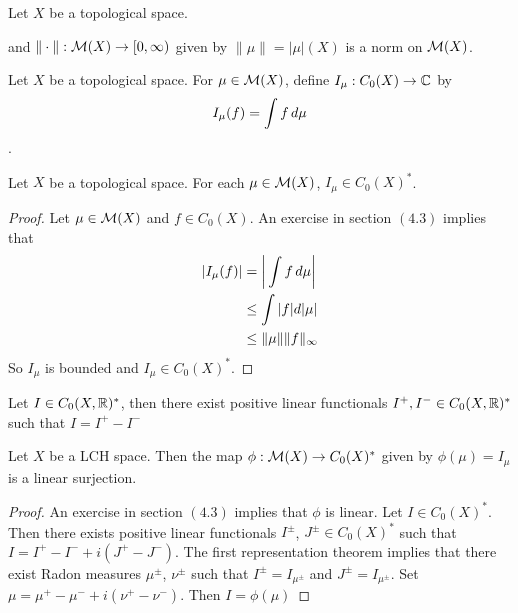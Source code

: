 \documentclass{book}
\begin{document}
	\begin{ex}
		Let $X$ be a topological space.
		
		and $\|\cdot\|: \mathcal{M}(X) \rightarrow [0,\infty)$ given by $\| \mu \| = |\mu|(X)$ is a norm on $\mathcal{M}(X)$. 
	\end{ex}		
	
	\begin{defn} \ld{00000} 
		Let $X$ be a topological space. For $\mu \in \mathcal{M}(X)$, define $I_{\mu} :C_0(X) \rightarrow \mathbb{C}$ by $$I_{\mu} (f) = \int f \, d \mu$$.
	\end{defn}
	
	\begin{ex}  
		Let $X$ be a topological space. For each $\mu \in \mathcal{M}(X)$, $I_\mu \in C_0(X)^*$.
	\end{ex}
	
	\begin{proof}
		Let $\mu \in \mathcal{M}(X)$ and $f \in C_0(X)$. An exercise in section $(4.3)$ implies that 
		\begin{align*}
			|I_{\mu}(f)| 
			&= \bigg| \int f \, d \mu \bigg| \\
			& \leq \int |f| d |\mu| \\
			& \leq \| \mu \| \|f\|_{\infty}
		\end{align*}
		So $I_{\mu}$ is bounded and $I_{\mu} \in C_0(X)^*$.
	\end{proof}
	
	\begin{thm}
		Let $I \in C_0(X, \mathbb{R})^*$, then there exist positive linear functionals $I^+, I^- \in C_0(X, \mathbb{R})^*$ such that $I = I^+ - I^-$
	\end{thm}
	
	\begin{ex}  
		Let $X$ be a LCH space. Then the map $ \phi: \mathcal{M}(X) \rightarrow C_0(X)^*$ given by $\phi(\mu) = I_{\mu}$ is a linear surjection.
	\end{ex}
	
	\begin{proof}
		An exercise in section $(4.3)$ implies that $\phi$ is linear. Let $I \in C_0(X)^*$. Then there exists positive linear functionals $I^{\pm}$, $J^{\pm} \in C_0(X)^*$ such that $I = I^+ - I^- + i(J^+ - J^-)$. The first representation theorem implies that there exist Radon measures $\mu^{\pm}$, $\nu^{\pm}$ such that $I^{\pm} = I_{\mu^{\pm}}$ and $J^{\pm} = I_{\mu^{\pm}}$. Set $\mu = \mu^+ - \mu^- +i(\nu^+ - \nu ^-)$. Then $I = \phi(\mu)$
	\end{proof}
	
\end{document}
